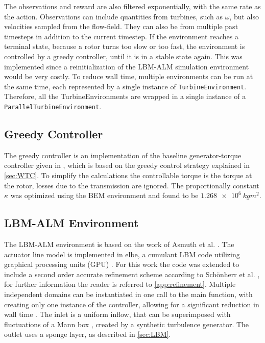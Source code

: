 The observations and reward are also filtered exponentially, with the same rate as the action. Observations can include quantities from turbines, such as $\omega$, but also velocities sampled from the flow-field. They can also be from multiple past timesteps in addition to the current timestep. If the environment reaches a terminal state, because a rotor turns too slow or too fast, the environment is controlled by a greedy controller, until it is in a stable state again. This was implemented since a reinitialization of the LBM-ALM simulation environment would be very costly. To reduce wall time, multiple environments can be run at the same time, each represented by a single instance of \texttt{TurbineEnvironment}. Therefore, all the TurbineEnvironments are wrapped in a single instance of a \texttt{ParallelTurbineEnvironment}. \\
\subsection{Greedy Controller}
The greedy controller is an implementation of the baseline generator-torque controller given in \cite{jonkman_definition_2009}, which is based on the greedy control strategy explained in \ref{sec:WTC}. To simplify the calculations the controllable torque is the torque at the rotor, losses due to the transmission are ignored. The proportionally constant $\kappa$ was optimized using the BEM environment and found to be $\SI{1.268e6}{kgm^2}$.
\subsection{LBM-ALM Environment}
The LBM-ALM environment is based on the work of Asmuth et al. \cite{asmuth_actuator_2020, asmuth_actuator_2019}. The actuator line model is implemented in elbe, a cumulant LBM code  utilizing graphical processing units (GPU) \cite{jansen_validation_2015, gehrke_scrutinizing_2017}. For this work the code was extended to include a second order accurate refinement scheme according to Schönherr et al. \cite{schonherr_towards_2015}, for further information the reader is referred to \autoref{app:refinement}. Multiple independent domains can be instantiated in one call to the main function, with creating only one instance of the controller, allowing for a significant reduction in wall time \cite{rabault_accelerating_2019}. The inlet is a uniform inflow, that can be superimposed with fluctuations of a Mann box \cite{mann_wind_1998}, created by a synthetic turbulence generator. The outlet uses a sponge layer, as described in \autoref{sec:LBM}.
